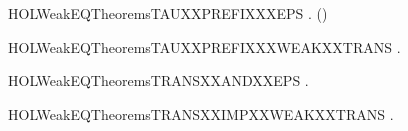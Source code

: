 \newcommand{\HOLWeakEQTheoremsSTRONGXXIMPXXWEAKXXEQUIV}{\UseVerbatim{HOLWeakEQTheoremsSTRONGXXIMPXXWEAKXXEQUIV}}
\begin{SaveVerbatim}{HOLWeakEQTheoremsTAUXXPREFIXXXEPS}
\HOLTokenTurnstile{} \HOLSymConst{\HOLTokenForall{}} .    \HOLSymConst{\HOLTokenImp{}}  (\HOLConst{\ensuremath{\tau}}) 
\end{SaveVerbatim}
\newcommand{\HOLWeakEQTheoremsTAUXXPREFIXXXEPS}{\UseVerbatim{HOLWeakEQTheoremsTAUXXPREFIXXXEPS}}
\begin{SaveVerbatim}{HOLWeakEQTheoremsTAUXXPREFIXXXWEAKXXTRANS}
\HOLTokenTurnstile{} \HOLSymConst{\HOLTokenForall{}}  .  \HOLTokenWeakTransBegin{}\HOLTokenWeakTransEnd {} \HOLSymConst{\HOLTokenImp{}} \HOLConst{\ensuremath{\tau}} \HOLTokenWeakTransBegin{}\HOLTokenWeakTransEnd {}
\end{SaveVerbatim}
\newcommand{\HOLWeakEQTheoremsTAUXXPREFIXXXWEAKXXTRANS}{\UseVerbatim{HOLWeakEQTheoremsTAUXXPREFIXXXWEAKXXTRANS}}
\begin{SaveVerbatim}{HOLWeakEQTheoremsTRANSXXANDXXEPS}
\HOLTokenTurnstile{} \HOLSymConst{\HOLTokenForall{}}   .  \HOLTokenTransBegin{}\HOLTokenTransEnd {} \HOLSymConst{\HOLTokenConj{}}    \HOLSymConst{\HOLTokenImp{}}  \HOLTokenWeakTransBegin{}\HOLTokenWeakTransEnd {}
\end{SaveVerbatim}
\newcommand{\HOLWeakEQTheoremsTRANSXXANDXXEPS}{\UseVerbatim{HOLWeakEQTheoremsTRANSXXANDXXEPS}}
\begin{SaveVerbatim}{HOLWeakEQTheoremsTRANSXXIMPXXWEAKXXTRANS}
\HOLTokenTurnstile{} \HOLSymConst{\HOLTokenForall{}}  .  \HOLTokenTransBegin{}\HOLTokenTransEnd {} \HOLSymConst{\HOLTokenImp{}}  \HOLTokenWeakTransBegin{}\HOLTokenWeakTransEnd {}
\end{SaveVerbatim}
\newcommand{\HOLWeakEQTheoremsTRANSXXIMPXXWEAKXXTRANS}{\UseVerbatim{HOLWeakEQTheoremsTRANSXXIMPXXWEAKXXTRANS}}
